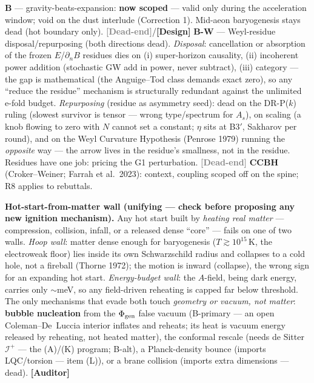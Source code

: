 \documentclass[11pt]{article}
\newcommand{\Auditor}{\textbf{\textcolor{teal!55!black}{[Auditor]}}}
\newcommand{\design}{\textcolor{blue!60!black}{\textbf{[Design]}}}
\newcommand{\dead}{\textcolor{gray}{\textbf{[Dead-end]}}}
\begin{document}
\textbf{B} --- gravity-beats-expansion: \textbf{now scoped} --- valid only during the acceleration window; void on the dust interlude (Correction 1). Mid-aeon baryogenesis stays dead (hot boundary only). \dead/\design\quad
\textbf{B-W} --- Weyl-residue disposal/repurposing (both directions dead). \emph{Disposal}: cancellation or absorption of the frozen $E$/$\partial_n B$ residues dies on (i) super-horizon causality, (ii) incoherent power addition (stochastic GW add in power, never subtract), (iii) category --- the gap is mathematical (the Anguige--Tod class demands exact zero), so any ``reduce the residue'' mechanism is structurally redundant against the unlimited e-fold budget. \emph{Repurposing} (residue as asymmetry seed): dead on the DR-P($k$) ruling (slowest survivor is tensor --- wrong type/spectrum for $A_s$), on scaling (a knob flowing to zero with $N$ cannot set a constant; $\eta$ sits at B3$'$, Sakharov per round), and on the Weyl Curvature Hypothesis (Penrose 1979) running the \emph{opposite} way --- the arrow lives in the residue's smallness, not in the residue. Residues have one job: pricing the G1 perturbation. \dead\quad
\textbf{CCBH} (Croker--Weiner; Farrah et al.\ 2023): context, coupling scoped off on the spine; R8 applies to rebuttals.

\medskip\noindent\textbf{Hot-start-from-matter wall (unifying --- check before proposing any new ignition mechanism).} Any hot start built by \emph{heating real matter} --- compression, collision, infall, or a released dense ``core'' --- fails on one of two walls. \emph{Hoop wall}: matter dense enough for baryogenesis ($T\gtrsim10^{15}$\,K, the electroweak floor) lies inside its own Schwarzschild radius and collapses to a cold hole, not a fireball (Thorne 1972); the motion is inward (collapse), the wrong sign for an expanding hot start. \emph{Energy-budget wall}: the $A$-field, being dark energy, carries only $\sim$meV, so any field-driven reheating is capped far below threshold. The only mechanisms that evade both touch \emph{geometry or vacuum, not matter}: \textbf{bubble nucleation} from the $\Phi_{\rm gen}$ false vacuum (B-primary --- an open Coleman--De~Luccia interior inflates and reheats; its heat is vacuum energy released by reheating, not heated matter), the conformal rescale (needs de Sitter $\mathscr I^+$ --- the (A)/(K) program; B-alt), a Planck-density bounce (imports LQC/torsion --- item (L)), or a brane collision (imports extra dimensions --- dead). \Auditor
\end{document}
